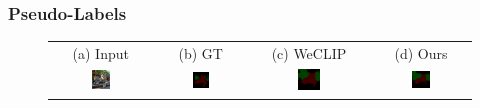 \subsubsection{Pseudo-Labels}

\begin{figure}[ht]
  \centering
  \setlength{\tabcolsep}{2pt} %
  \renewcommand{\arraystretch}{0.9}
  \begin{tcolorbox}[colframe=black!60, colback=white, boxrule=0.8pt, arc=2pt, left=2pt, right=2pt, top=2pt, bottom=2pt]
    \centering
    \begin{tabular}{cccc}
      (a) Input & (b) GT & (c) WeCLIP & (d) Ours           \\
      [1mm]

      \includegraphics[width=0.20\textwidth,height=0.20\textwidth]
      {figures/originals/2007_003778}
                &
      \includegraphics[width=0.20\textwidth,height=0.20\textwidth]
      {figures/colored_gts/2007_003778}
                &
      \includegraphics[width=0.20\textwidth,height=0.20\textwidth]
      {figures/val_labels/weclip/2007_003778_[7, 15]}
                &
      \includegraphics[width=0.20\textwidth,height=0.20\textwidth]
      {figures/val_labels/ours/2007_003778_[7, 15]}    \\


\end{tabular}
\end{tcolorbox}
\end{figure}
